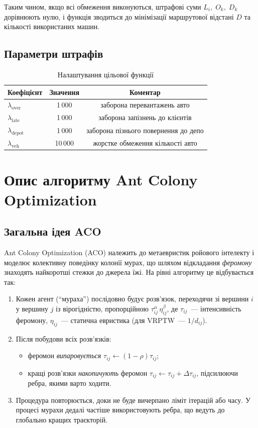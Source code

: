 \documentclass[12pt,a4paper]{article}
\begin{document}
Таким чином, якщо всі обмеження виконуються,
штрафові суми \(L_i,\;O_k,\;D_k\) дорівнюють нулю,
і функція зводиться до мінімізації маршрутової відстані \(D\)
та кількості використаних машин.

\subsection{Параметри штрафів}
\begin{table}[h]
\centering\begin{tabular}{lcc}
\toprule
Коефіцієнт & Значення & Коментар\\
\midrule
$\lambda_\text{over}$ & 1\,000 & заборона перевантажень авто\\
$\lambda_\text{late}$ & 1\,000 & заборона запізнень до клієнтів\\
$\lambda_\text{depot}$ & 1\,000 & заборона пізнього повернення до депо\\
$\lambda_\text{veh}$  & 10\,000 & жорстке обмеження кількості авто\\
\bottomrule
\end{tabular}
\caption{Налаштування цільової функції}
\end{table}

\section{Опис алгоритму Ant Colony Optimization}
\subsection{Загальна ідея ACO}
Ant Colony Optimization (ACO) належить до метаевристик ройового
інтелекту і моделює колективну поведінку колонії мурах, що
шляхом відкладання \emph{феромону} знаходять найкоротші стежки до
джерела їжі.  На рівні алгоритму це відбувається так:

\begin{enumerate}
  \item Кожен агент (``мураха'') послідовно будує розв’язок,
        переходячи зі вершини \(i\) у вершину \(j\) із вірогідністю,
        пропорційною \(\tau_{ij}^{\alpha}\,\eta_{ij}^{\beta}\),  
        де \(\tau_{ij}\)~— інтенсивність феромону,  
        \(\eta_{ij}\)~— статична евристика  
        (для VRPTW~— \(1/d_{ij}\)).
  \item Після побудови всіх розв’язків:
        \begin{itemize}
          \item феромон \emph{випаровується}  
                \(\tau_{ij}\leftarrow(1-\rho)\tau_{ij}\);
          \item кращі розв’язки \emph{накопичують} феромон  
                \(\tau_{ij}\leftarrow\tau_{ij}+ \Delta\tau_{ij}\),
                підсилюючи ребра, якими варто ходити.
        \end{itemize}
  \item Процедура повторюється, доки не буде вичерпано ліміт
        ітерацій або часу.  У процесі мурахи дедалі частіше
        використовують ребра, що ведуть до глобально кращих
        траєкторій.
\end{enumerate}
\end{document}
